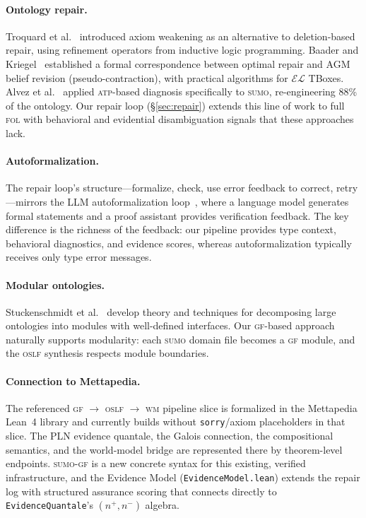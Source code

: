 \documentclass[11pt]{article}
\newcommand{\SUMO}{\textsc{sumo}}
\newcommand{\GF}{\textsc{gf}}
\newcommand{\OSLF}{\textsc{oslf}}
\newcommand{\WM}{\textsc{wm}}
\newcommand{\FOL}{\textsc{fol}}
\newcommand{\ATP}{\textsc{atp}}
\theoremstyle{definition}
\theoremstyle{plain}
\begin{document}
\paragraph{Ontology repair.}
Troquard et al.~\cite{troquard2018weakening} introduced axiom weakening
as an alternative to deletion-based repair, using refinement operators
from inductive logic programming.  Baader and
Kriegel~\cite{baader2023pseudocontraction,baader2022fixedpremise}
established a formal correspondence between optimal repair and AGM
belief revision (pseudo-contraction), with practical algorithms for
$\mathcal{EL}$ TBoxes.  Alvez et al.~\cite{alvez2012adimensumo}
applied \ATP{}-based diagnosis specifically to \SUMO{}, re-engineering
88\% of the ontology.  Our repair loop (\S\ref{sec:repair}) extends
this line of work to full \FOL{} with behavioral and evidential
disambiguation signals that these approaches lack.

\paragraph{Autoformalization.}
The repair loop's structure---formalize, check, use error feedback to
correct, retry---mirrors the LLM autoformalization
loop~\cite{autoformalization-survey}, where a language model generates
formal statements and a proof assistant provides verification feedback.
The key difference is the richness of the feedback: our pipeline
provides type context, behavioral diagnostics, and evidence scores,
whereas autoformalization typically receives only type error messages.

\paragraph{Modular ontologies.}
Stuckenschmidt et al.~\cite{stuckenschmidt-modular-ontologies}
develop theory and techniques for decomposing large ontologies into
modules with well-defined interfaces.
Our \GF{}-based approach naturally supports modularity: each \SUMO{}
domain file becomes a \GF{} module, and the \OSLF{} synthesis respects
module boundaries.

\paragraph{Connection to Mettapedia.}
The referenced \GF{} $\to$ \OSLF{} $\to$ \WM{} pipeline slice is formalized in
the Mettapedia Lean~4 library and currently builds without
\texttt{sorry}/axiom placeholders in that slice.
The PLN evidence quantale, the Galois connection, the compositional
semantics, and the world-model bridge are represented there by theorem-level
endpoints.
\SUMO{}-\GF{} is a new concrete syntax for this existing,
verified infrastructure, and the Evidence Model
(\texttt{EvidenceModel.lean}) extends the repair log with structured
assurance scoring that connects directly to
\texttt{EvidenceQuantale}'s $(n^+, n^-)$ algebra.
\end{document}
